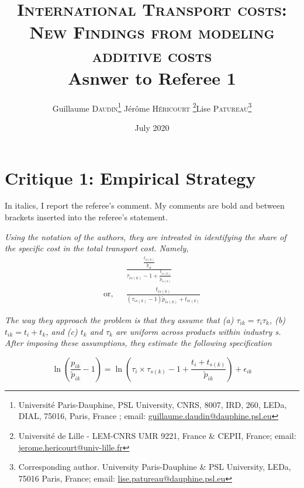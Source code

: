 \documentclass[a4paper,12pt]{article}
\begin{document}
\title{\textsc{International Transport costs:\\New Findings from modeling additive costs} \\
Asnwer to Referee 1}

\author{Guillaume \textsc{Daudin}\thanks{%
Université Paris-Dauphine, PSL University, CNRS, 8007, IRD, 260, LEDa, DIAL, 75016, Paris, France ; email: \url{guillaume.daudin@dauphine.psl.eu}}  \qquad J\'{e}r\^{o}me \textsc{H\'{e}ricourt} \thanks{Universit\'{e} de Lille - LEM-CNRS UMR 9221, France \& CEPII, France; email: \url{jerome.hericourt@univ-lille.fr}}\qquad Lise \textsc{Patureau}\thanks{Corresponding author.
University Paris-Dauphine \& PSL University, LEDa, 75016 Paris, France;  email: \url{lise.patureau@dauphine.psl.eu} } }


\date{July 2020}
 \maketitle
\bigskip


\section{Critique 1: Empirical Strategy}

In italics, I report the referee's comment. My comments are bold and between brackets inserted into the referee's statement.

\textit{Using the notation of the authors, they are intreated
in identifying the share of the specific cost in the total transport cost. Namely,}
\begin{eqnarray*}
&& \frac{\frac{t_{is(k)}}{\tilde{p}_{ik}}}{\tau_{is(k)}-1 + \frac{t_{is(k)}}{\tilde{p}_{is(k)}}} \\
\text{or,} &&\frac{t_{is(k)}}{(\tau_{is(k)}-1)\tilde{p}_{is(k)} + t_{is(k)}}
\end{eqnarray*}

\textit{The way they approach the problem is that they assume that (a) $\tau_{ik} = \tau_i\tau_{k}$,
(b) $t_{ik} = t_i +t_k$, and (c) $t_k$ and $\tau_k$ are uniform across products within industry
s. After imposing these assumptions, they estimate the following specification}

\begin{equation}
\ln\left(\frac{p_{ik}}{\widetilde{p}_{ik}}-1 \right)= \ln \left(\tau_{i} \times \tau_{s(k)} -1+\frac{t_{i} + t_{s(k)}}{\widetilde{p}_{ik}} \right) + \epsilon_{ik} \label{eq:equation0}
\end{equation}
\end{document}

